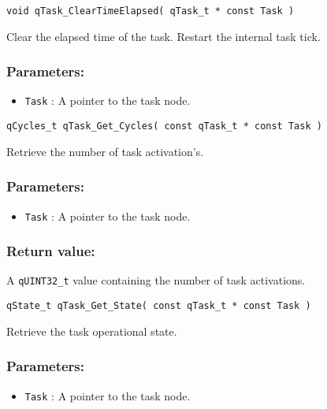\noindent\hrulefill


\begin{lstlisting}[style=CStyle]
void qTask_ClearTimeElapsed( qTask_t * const Task )
\end{lstlisting}

Clear the elapsed time of the task. Restart the internal task tick. 

\subsubsection*{Parameters:}
\begin{itemize}
    \item \lstinline{Task} : A pointer to the task node.
\end{itemize}

\noindent\hrulefill


\begin{lstlisting}[style=CStyle]
qCycles_t qTask_Get_Cycles( const qTask_t * const Task )
\end{lstlisting}

Retrieve the number of task activation's. 

\subsubsection*{Parameters:}
\begin{itemize}
    \item \lstinline{Task} : A pointer to the task node.
\end{itemize}


\subsubsection*{Return value:}
A \lstinline{qUINT32_t} value containing the number of task activations.

\noindent\hrulefill


\begin{lstlisting}[style=CStyle]
qState_t qTask_Get_State( const qTask_t * const Task )
\end{lstlisting}

Retrieve the task operational state. 

\subsubsection*{Parameters:}
\begin{itemize}
    \item \lstinline{Task} : A pointer to the task node.
\end{itemize}


